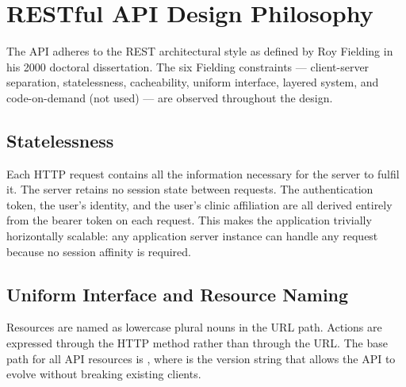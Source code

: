 \section{RESTful API Design Philosophy}
\label{sec:rest-philosophy}

The API adheres to the REST architectural style as defined by Roy
Fielding in his 2000 doctoral dissertation. The six Fielding constraints
--- client-server separation, statelessness, cacheability, uniform
interface, layered system, and code-on-demand (not used) --- are
observed throughout the design.

\subsection{Statelessness}

Each HTTP request contains all the information necessary for the server
to fulfil it. The server retains no session state between requests. The
authentication token, the user's identity, and the user's clinic
affiliation are all derived entirely from the bearer token on each
request. This makes the application trivially horizontally scalable:
any application server instance can handle any request because no
session affinity is required.

\subsection{Uniform Interface and Resource Naming}

Resources are named as lowercase plural nouns in the URL path. Actions
are expressed through the HTTP method rather than through the URL. The
base path for all API resources is , where
\texttt{\apiversion{}} is the version string that allows the API to
evolve without breaking existing clients.

